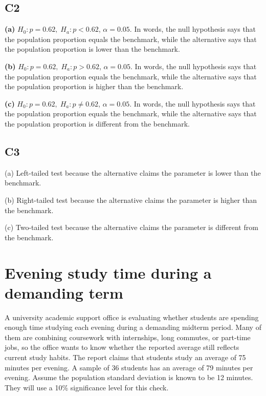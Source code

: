 		\subsection*{C2}
		\textbf{(a)} \(H_0\colon p=0.62,\; H_a\colon p<0.62\), \(\alpha=0.05\). In words, the null hypothesis says that the population proportion equals the benchmark, while the alternative says that the population proportion is lower than the benchmark.
		
		\textbf{(b)} \(H_0\colon p=0.62,\; H_a\colon p>0.62\), \(\alpha=0.05\). In words, the null hypothesis says that the population proportion equals the benchmark, while the alternative says that the population proportion is higher than the benchmark.
		
		\textbf{(c)} \(H_0\colon p=0.62,\; H_a\colon p\ne 0.62\), \(\alpha=0.05\). In words, the null hypothesis says that the population proportion equals the benchmark, while the alternative says that the population proportion is different from the benchmark.
		
		\subsection*{C3}
		(a) Left-tailed test because the alternative claims the parameter is lower than the benchmark.\LeftTailGraph
		
		(b) Right-tailed test because the alternative claims the parameter is higher than the benchmark.\RightTailGraph
		
		(c) Two-tailed test because the alternative claims the parameter is different from the benchmark.\TwoTailGraph
		

	\section{Evening study time during a demanding term}
		A university academic support office is evaluating whether students are spending enough time studying each evening during a demanding midterm period. Many of them are combining coursework with internships, long commutes, or part-time jobs, so the office wants to know whether the reported average still reflects current study habits. The report claims that students study an average of 75 minutes per evening. A sample of 36 students has an average of 79 minutes per evening. Assume the population standard deviation is known to be 12 minutes. They will use a 10\% significance level for this check.
		

